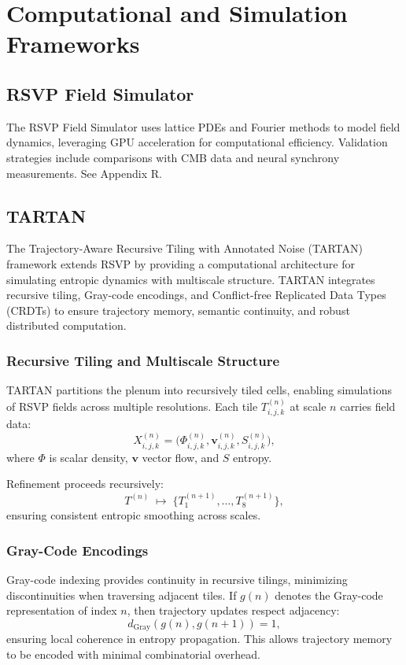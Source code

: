 \documentclass[12pt]{report}
\begin{document}
\part{Computational and Simulation Frameworks}

\chapter{RSVP Field Simulator}
The RSVP Field Simulator uses lattice PDEs and Fourier methods to model field dynamics, leveraging GPU acceleration for computational efficiency. Validation strategies include comparisons with CMB data and neural synchrony measurements. See Appendix R.
\chapter{TARTAN}

The Trajectory-Aware Recursive Tiling with Annotated Noise (TARTAN) framework extends RSVP by providing a computational architecture for simulating entropic dynamics with multiscale structure.  
TARTAN integrates recursive tiling, Gray-code encodings, and Conflict-free Replicated Data Types (CRDTs) to ensure trajectory memory, semantic continuity, and robust distributed computation.

\section{Recursive Tiling and Multiscale Structure}

TARTAN partitions the plenum into recursively tiled cells, enabling simulations of RSVP fields across multiple resolutions. Each tile $T_{i,j,k}^{(n)}$ at scale $n$ carries field data:
\[
X^{(n)}_{i,j,k} = \big(\Phi^{(n)}_{i,j,k}, \mathbf{v}^{(n)}_{i,j,k}, S^{(n)}_{i,j,k}\big),
\]
where $\Phi$ is scalar density, $\mathbf{v}$ vector flow, and $S$ entropy.

Refinement proceeds recursively:
\[
T^{(n)} \;\mapsto\; \{ T^{(n+1)}_1, \dots, T^{(n+1)}_8 \},
\]
ensuring consistent entropic smoothing across scales.

\section{Gray-Code Encodings}

Gray-code indexing provides continuity in recursive tilings, minimizing discontinuities when traversing adjacent tiles.  
If $g(n)$ denotes the Gray-code representation of index $n$, then trajectory updates respect adjacency:
\[
d_{\text{Gray}}(g(n), g(n+1)) = 1,
\]
ensuring local coherence in entropy propagation. This allows trajectory memory to be encoded with minimal combinatorial overhead.
\end{document}
